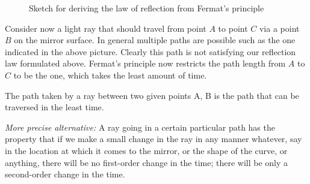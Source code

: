 \documentclass[
  a4paper,
]{book}
\begin{document}
\begin{figure}


\caption{\label{fig-fermat}Sketch for deriving the law of reflection
from Fermat's principle}

\end{figure}%

Consider now a light ray that should travel from point \(A\) to point
\(C\) via a point \(B\) on the mirror surface. In general multiple paths
are possible such as the one indicated in the above picture. Clearly
this path is not satisfying our reflection law formulated above.
Fermat's principle now restricts the path length from \(A\) to \(C\) to
be the one, which takes the least amount of time.

\begin{tcolorbox}[enhanced jigsaw, coltitle=black, title=\textcolor{quarto-callout-tip-color}{\faLightbulb}\hspace{0.5em}{Fermat's principle}, colframe=quarto-callout-tip-color-frame, toprule=.15mm, opacitybacktitle=0.6, left=2mm, opacityback=0, breakable, toptitle=1mm, bottomtitle=1mm, leftrule=.75mm, arc=.35mm, titlerule=0mm, colbacktitle=quarto-callout-tip-color!10!white, rightrule=.15mm, bottomrule=.15mm, colback=white]

The path taken by a ray between two given points A, B is the path that
can be traversed in the least time.

\emph{More precise alternative:} A ray going in a certain particular
path has the property that if we make a small change in the ray in any
manner whatever, say in the location at which it comes to the mirror, or
the shape of the curve, or anything, there will be no first-order change
in the time; there will be only a second-order change in the time.

\end{tcolorbox}
\end{document}
